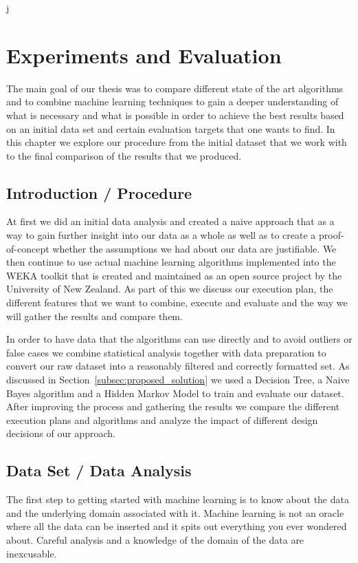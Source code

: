 j\section{Experiments and Evaluation}
\label{sec:experiments}

The main goal of our thesis was to compare different state of the art algorithms and to combine machine learning techniques to gain a deeper understanding of what is necessary and what is possible in order to achieve the best results based on an initial data set and certain evaluation targets that one wants to find. In this chapter we explore our procedure from the initial dataset that we work with to the final comparison of the results that we produced.



\subsection{Introduction / Procedure}

At first we did an initial data analysis and created a naive approach that as a way to gain further insight into our data as a whole as well as to create a proof-of-concept whether the assumptions we had about our data are justifiable. 
We then continue to use actual machine learning algorithms implemented into the WEKA toolkit that is created and maintained as an open source project by the University of New Zealand. As part of this we discuss our execution plan, the different features that we want to combine, execute and evaluate and the way we will gather the results and compare them.

In order to have data that the algorithms can use directly and to avoid outliers or false cases we combine statistical analysis together with data preparation to convert our raw dataset into a reasonably filtered and correctly formatted set. As discussed in Section~\ref{subsec:proposed_solution} we used a Decision Tree, a Naive Bayes algorithm and a Hidden Markov Model to train and evaluate our dataset. After improving the process and gathering the results we compare the different execution plans and algorithms and analyze the impact of different design decisions of our approach.

\subsection{Data Set / Data Analysis}
\label{subsec:data_set}
The first step to getting started with machine learning is to know about the data and the underlying domain associated with it. Machine learning is not an oracle where all the data can be inserted and it spits out everything you ever wondered about. Careful analysis and a knowledge of the domain of the data are inexcusable. 

